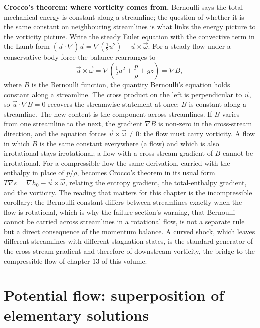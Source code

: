 \begin{mastery}
\textbf{Crocco's theorem: where vorticity comes from.} Bernoulli says
the total mechanical energy is constant along a streamline; the
question of whether it is the same constant on neighbouring streamlines
is what links the energy picture to the vorticity picture. Write the
steady Euler equation with the convective term in the Lamb form
$(\vec u\cdot\nabla)\vec u = \nabla(\tfrac12 u^2) - \vec u\times
\vec\omega$. For a steady flow under a conservative body force the
balance rearranges to
\[
\vec u\times\vec\omega = \nabla\!\left(\tfrac12 u^2 + \frac{p}{\rho}
+ gz\right) = \nabla B,
\]
where $B$ is the Bernoulli function, the quantity Bernoulli's equation
holds constant along a streamline. The cross product on the left is
perpendicular to $\vec u$, so $\vec u\cdot\nabla B = 0$ recovers the
streamwise statement at once: $B$ is constant along a streamline. The
new content is the component across streamlines. If $B$ varies from one
streamline to the next, the gradient $\nabla B$ is non-zero in the
cross-stream direction, and the equation forces $\vec u\times\vec\omega
\neq 0$: the flow must carry vorticity. A flow in which $B$ is the same
constant everywhere (a  flow) and which is also
irrotational stays irrotational; a flow with a cross-stream gradient of
$B$ cannot be irrotational. For a compressible flow the same derivation,
carried with the enthalpy in place of $p/\rho$, becomes Crocco's
theorem in its usual form $T\nabla s = \nabla h_0 - \vec u\times
\vec\omega$, relating the entropy gradient, the total-enthalpy
gradient, and the vorticity. The reading that matters for this chapter
is the incompressible corollary: the Bernoulli constant differs
between streamlines exactly when the flow is rotational, which is why
the failure section's warning, that Bernoulli cannot be carried across
streamlines in a rotational flow, is not a separate rule but a direct
consequence of the momentum balance. A curved shock, which leaves
different streamlines with different stagnation states, is the standard
generator of the cross-stream gradient and therefore of downstream
vorticity, the bridge to the compressible flow of chapter 13 of this
volume.
\end{mastery}

\section{Potential flow: superposition of elementary solutions}

